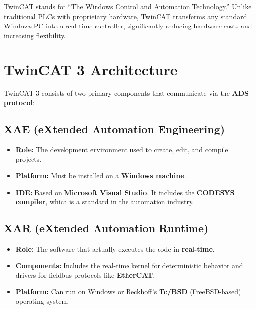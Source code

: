 \documentclass[11pt,a4paper]{article}
\begin{document}
\begin{notebox}
TwinCAT stands for ``The Windows Control and Automation Technology.'' Unlike traditional PLCs with proprietary hardware, TwinCAT transforms any standard Windows PC into a real-time controller, significantly reducing hardware costs and increasing flexibility.
\end{notebox}

\section{TwinCAT 3 Architecture}

TwinCAT 3 consists of two primary components that communicate via the \textbf{ADS protocol}:

\subsection{XAE (eXtended Automation Engineering)}

\begin{itemize}[leftmargin=*]
    \item \textbf{Role:} The development environment used to create, edit, and compile projects.
    \item \textbf{Platform:} Must be installed on a \textbf{Windows machine}.
    \item \textbf{IDE:} Based on \textbf{Microsoft Visual Studio}. It includes the \textbf{CODESYS compiler}, which is a standard in the automation industry.
\end{itemize}

\subsection{XAR (eXtended Automation Runtime)}

\begin{itemize}[leftmargin=*]
    \item \textbf{Role:} The software that actually executes the code in \textbf{real-time}.
    \item \textbf{Components:} Includes the real-time kernel for deterministic behavior and drivers for fieldbus protocols like \textbf{EtherCAT}.
    \item \textbf{Platform:} Can run on Windows or Beckhoff's \textbf{Tc/BSD} (FreeBSD-based) operating system.
\end{itemize}
\end{document}
